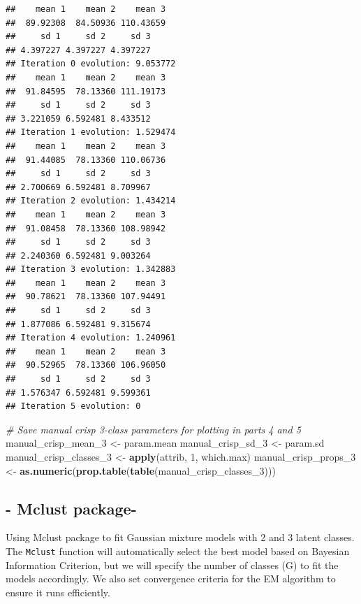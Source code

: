 \documentclass[
]{article}
\newenvironment{Shaded}{\begin{snugshade}}{\end{snugshade}}
\newcommand{\CommentTok}[1]{\textcolor[rgb]{0.56,0.35,0.01}{\textit{#1}}}
\newcommand{\DecValTok}[1]{\textcolor[rgb]{0.00,0.00,0.81}{#1}}
\newcommand{\FunctionTok}[1]{\textcolor[rgb]{0.13,0.29,0.53}{\textbf{#1}}}
\newcommand{\NormalTok}[1]{#1}
\newcommand{\OtherTok}[1]{\textcolor[rgb]{0.56,0.35,0.01}{#1}}
\begin{document}
\begin{verbatim}
##    mean 1    mean 2    mean 3 
##  89.92308  84.50936 110.43659 
##     sd 1     sd 2     sd 3 
## 4.397227 4.397227 4.397227 
## Iteration 0 evolution: 9.053772 
##    mean 1    mean 2    mean 3 
##  91.84595  78.13360 111.19173 
##     sd 1     sd 2     sd 3 
## 3.221059 6.592481 8.433512 
## Iteration 1 evolution: 1.529474 
##    mean 1    mean 2    mean 3 
##  91.44085  78.13360 110.06736 
##     sd 1     sd 2     sd 3 
## 2.700669 6.592481 8.709967 
## Iteration 2 evolution: 1.434214 
##    mean 1    mean 2    mean 3 
##  91.08458  78.13360 108.98942 
##     sd 1     sd 2     sd 3 
## 2.240360 6.592481 9.003264 
## Iteration 3 evolution: 1.342883 
##    mean 1    mean 2    mean 3 
##  90.78621  78.13360 107.94491 
##     sd 1     sd 2     sd 3 
## 1.877086 6.592481 9.315674 
## Iteration 4 evolution: 1.240961 
##    mean 1    mean 2    mean 3 
##  90.52965  78.13360 106.96050 
##     sd 1     sd 2     sd 3 
## 1.576347 6.592481 9.599361 
## Iteration 5 evolution: 0
\end{verbatim}

\begin{Shaded}
\begin{Highlighting}[]
\CommentTok{\# Save manual crisp 3{-}class parameters for plotting in parts 4 and 5}
\NormalTok{manual\_crisp\_mean\_3 }\OtherTok{\textless{}{-}}\NormalTok{ param.mean}
\NormalTok{manual\_crisp\_sd\_3 }\OtherTok{\textless{}{-}}\NormalTok{ param.sd}
\NormalTok{manual\_crisp\_classes\_3 }\OtherTok{\textless{}{-}} \FunctionTok{apply}\NormalTok{(attrib, }\DecValTok{1}\NormalTok{, which.max)}
\NormalTok{manual\_crisp\_props\_3 }\OtherTok{\textless{}{-}} \FunctionTok{as.numeric}\NormalTok{(}\FunctionTok{prop.table}\NormalTok{(}\FunctionTok{table}\NormalTok{(manual\_crisp\_classes\_3)))}
\end{Highlighting}
\end{Shaded}

\subsection{- Mclust package-}\label{mclust-package-}

Using Mclust package to fit Gaussian mixture models with 2 and 3 latent
classes. The \texttt{Mclust} function will automatically select the best
model based on Bayesian Information Criterion, but we will specify the
number of classes (G) to fit the models accordingly. We also set
convergence criteria for the EM algorithm to ensure it runs efficiently.
\end{document}
